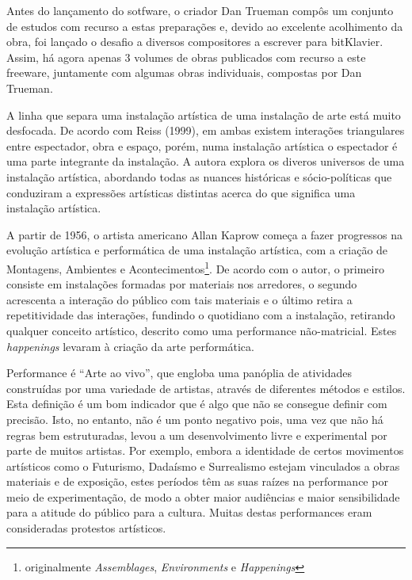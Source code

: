 \documentclass[../main.tex]{subfiles}
\begin{document}
Antes do lançamento do sotfware, o criador Dan Trueman compôs um conjunto de estudos com recurso a estas preparações e, devido ao excelente acolhimento da obra, foi lançado o desafio a diversos compositores a escrever para bitKlavier.
Assim, há agora apenas 3 volumes de obras publicados com recurso a este freeware\cite{trueman2015a,trueman2015b,trueman2024}, juntamente com algumas obras individuais, compostas por Dan Trueman.


A linha que separa uma instalação artística de uma instalação de arte está muito desfocada\cite{bishop2005}. De acordo com Reiss (1999), em ambas existem interações triangulares entre espectador, obra e espaço, porém, numa instalação artística o espectador é uma parte integrante da instalação\cite{reiss1999}. A autora explora os diveros universos de uma instalação artística, abordando todas as nuances históricas e sócio-políticas que conduziram a expressões artísticas distintas acerca do que significa uma instalação artística.

A partir de 1956, o artista americano Allan Kaprow começa a fazer progressos na evolução artística e performática de uma instalação artística, com a criação de Montagens, Ambientes e Acontecimentos\footnote{originalmente \textit{Assemblages}, \textit{Environments} e \textit{Happenings}}\cite{kaprow1956}. De acordo com o autor, o primeiro consiste em instalações formadas por materiais nos arredores, o segundo acrescenta a interação do público com tais materiais e o último retira a repetitividade das interações, fundindo o quotidiano com a instalação, retirando qualquer conceito artístico\cite{kaprow1956}, descrito como uma performance não-matricial\cite{kirby1965}. Estes \textit{happenings} levaram à criação da arte performática\cite{howell1999}.

Performance é \enquote{Arte ao vivo}\cite{goldberg_battcock}, que engloba uma panóplia de atividades construídas por uma variedade de artistas, através de diferentes métodos e estilos. Esta definição é um bom indicador que é algo que não se consegue definir com precisão. Isto, no entanto, não é um ponto negativo pois, uma vez que não há regras bem estruturadas, levou a um desenvolvimento livre e experimental por parte de muitos artistas\cite{nickas}. Por exemplo, embora a identidade de certos movimentos artísticos como o Futurismo, Dadaísmo e Surrealismo estejam vinculados a obras materiais e de exposição, estes períodos têm as suas raízes na performance por meio de experimentação, de modo a obter maior audiências e maior sensibilidade para a atitude do público para a cultura. Muitas destas performances eram consideradas protestos artísticos\cite{goldberg_battcock}.
\end{document}
